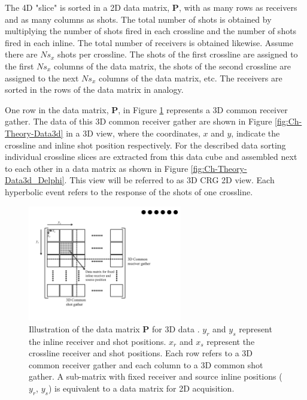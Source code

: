 The 4D "slice" is sorted in a 2D data matrix, $\mathbf{P}$, with as many rows as receivers and as many columns as shots. The total number of shots is obtained by multiplying the number of shots fired in each crossline and the number of shots fired in each inline. The total number of receivers is obtained likewise. Assume there are $Ns_x$ shots per crossline. The shots of the first crossline are assigned to the first $Ns_x$ columns of the data matrix, the shots of the second crossline are assigned to the next $Ns_x$ columns of the data matrix, etc. The receivers are sorted in the rows of the data matrix in analogy.

One row in the data matrix, $\mathbf{P}$, in Figure \ref{fig:Ch-Theory-DelphiFormat} represents  a 3D common receiver gather. The data of this 3D common receiver gather are shown in Figure \ref{fig:Ch-Theory-Data3d} in a 3D view, where the coordinates, $x$ and $y$, indicate the crossline and inline shot position respectively. For the described data sorting individual crossline slices are extracted from this data cube and assembled next to each other in a data matrix as shown in Figure \ref{fig:Ch-Theory-Data3d_Delphi}. This view will be referred to as 3D CRG 2D view. Each hyperbolic event refers to the response of the shots of one crossline.

\begin{figure}
	\centering
	\includegraphics[width=0.6\textwidth]{Plots/DelphiFormat-v2}
	\caption{Illustration of the data matrix $\mathbf{P}$ for 3D data \citep{Delphi-Format}. $y_r$ and $y_s$ represent the inline receiver and shot positions. $x_r$ and $x_s$ represent the crossline receiver and shot positions. Each row refers to a 3D common receiver gather and each column to a 3D common shot gather. A sub-matrix with fixed receiver and source inline positions ($y_r$, $y_s$) is equivalent to a data matrix for 2D acquisition.}
	\label{fig:Ch-Theory-DelphiFormat}
\end{figure}


